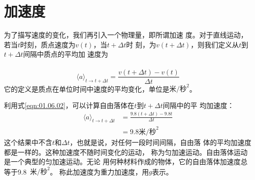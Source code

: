 \section[加速度]{加\hspace{1em}速\hspace{1em}度}\label{sec:01.08}

为了描写速度的变化，我们再引入一个物理量，即所谓加速
度。对于直线运动，若当$t$时刻，质点速度为$v\left(t\right)$，当$t+\Delta t$时
刻，为$v\left(t+\Delta t\right)$，则我们定义从$t$到$t+\Delta t$间隔中质点的平均加
速度为\\~\vspace{-2em}
\begin{equation}\label{eqn:01.08.01}
 \langle a\rangle_{t\rightarrow t+\Delta t} = \frac{v\left(t+\Delta t\right)-v\left(t\right)}{\Delta t}
\end{equation}
它的定义是质点在单位时间中速度的平均变化，单位是$\text{米/秒}^2$。

利用式\eqref{eqn:01.06.02}，可以计算自由落体在$t$到$t+\Delta t$间隔中的平
均加速度：\vspace{-1em}
\begin{equation*}
 \begin{aligned}
 \langle a\rangle_{t\rightarrow t+\Delta t} & = \frac{9.8\left(t+\Delta t\right)-9.8t}{\Delta t} \\
 & = 9.8\text{米/秒}^2
 \end{aligned}
\end{equation*}
这个结果中不含$t$和$\Delta t$，也就是说，对任何一段时间间隔，自由落
体的平均加速度都是一样的。这种加速度不随时间变化的运动，
称为匀加速运动。自由落体运动是一个典型的匀加速运动。无论
用何种材料作成的物体，它的自由落体加速度总等于9.8~$\text{米/秒}^2$。
称此加速度为重力加速度，用$g$表示。

